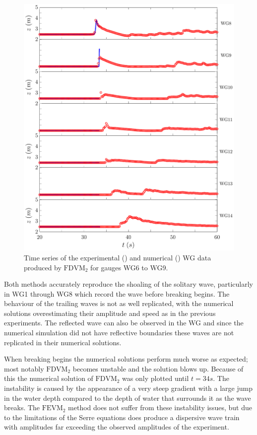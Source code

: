 \begin{figure}
	\centering
	\includegraphics[width=\textwidth]{./chp6/figures/Experiment/Roeber/Trial8/FDVM/LongWGs2.pdf}
	\caption{Time series of the experimental () and numerical ({\color{blue}\solidrule}) WG data produced by $\text{FDVM}_2$ for gauges WG6 to WG9.}
	\label{fig:Roeber8WG6to9FDVM}
\end{figure} 

Both methods accurately reproduce the shoaling of the solitary wave, particularly in WG1 through WG8 which record the wave before breaking begins. The behaviour of the trailing waves is not as well replicated, with the numerical solutions overestimating their amplitude and speed as in the previous experiments. The reflected wave can also be observed in the WG and since the numerical simulation did not have reflective boundaries these waves are not replicated in their numerical solutions.

When breaking begins the numerical solutions perform much worse as expected; most notably $\text{FDVM}_2$ becomes unstable and the solution blows up. Because of this the numerical solution of $\text{FDVM}_2$ was only plotted until $t = 34s$. The instability is caused by the appearance of a very steep gradient with a large jump in the water depth compared to the depth of water that surrounds it as the wave breaks. The $\text{FEVM}_2$ method does not suffer from these instability issues, but due to the limitations of the Serre equations does produce a dispersive wave train with amplitudes far exceeding the observed amplitudes of the experiment. 


